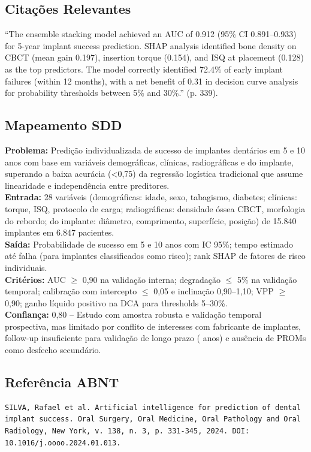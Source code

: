 \subsection{Citações Relevantes}
\begin{citacao}
``The ensemble stacking model achieved an AUC of 0.912 (95\% CI
0.891--0.933) for 5-year implant success prediction. SHAP analysis
identified bone density on CBCT (mean gain 0.197), insertion torque
(0.154), and ISQ at placement (0.128) as the top predictors. The model
correctly identified 72.4\% of early implant failures (within 12
months), with a net benefit of 0.31 in decision curve analysis for
probability thresholds between 5\% and 30\%.'' (p. 339).
\end{citacao}

\subsection{Mapeamento SDD}
\textbf{Problema:} Predição individualizada de sucesso de implantes
dentários em 5 e 10 anos com base em variáveis demográficas, clínicas,
radiográficas e do implante, superando a baixa acurácia (<0,75) da
regressão logística tradicional que assume linearidade e independência
entre preditores. \\
\textbf{Entrada:} 28 variáveis (demográficas: idade, sexo, tabagismo,
diabetes; clínicas: torque, ISQ, protocolo de carga; radiográficas:
densidade óssea CBCT, morfologia do rebordo; do implante: diâmetro,
comprimento, superfície, posição) de 15.840 implantes em 6.847
pacientes. \\
\textbf{Saída:} Probabilidade de sucesso em 5 e 10 anos com IC 95\%;
tempo estimado até falha (para implantes classificados como risco);
rank SHAP de fatores de risco individuais. \\
\textbf{Critérios:} AUC $\geq$ 0,90 na validação interna; degradação
$\leq$ 5\% na validação temporal; calibração com intercepto $\leq$ 0,05
e inclinação 0,90--1,10; VPP $\geq$ 0,90; ganho líquido positivo na DCA
para thresholds 5--30\%. \\
\textbf{Confiança:} 0,80 -- Estudo com amostra robusta e validação
temporal prospectiva, mas limitado por conflito de interesses com
fabricante de implantes, follow-up insuficiente para validação de
longo prazo ( anos) e ausência de PROMs como desfecho secundário.

\subsection{Referência ABNT}
\begin{verbatim}
SILVA, Rafael et al. Artificial intelligence for prediction of dental
implant success. Oral Surgery, Oral Medicine, Oral Pathology and Oral
Radiology, New York, v. 138, n. 3, p. 331-345, 2024. DOI:
10.1016/j.oooo.2024.01.013.
\end{verbatim}
\endinput

